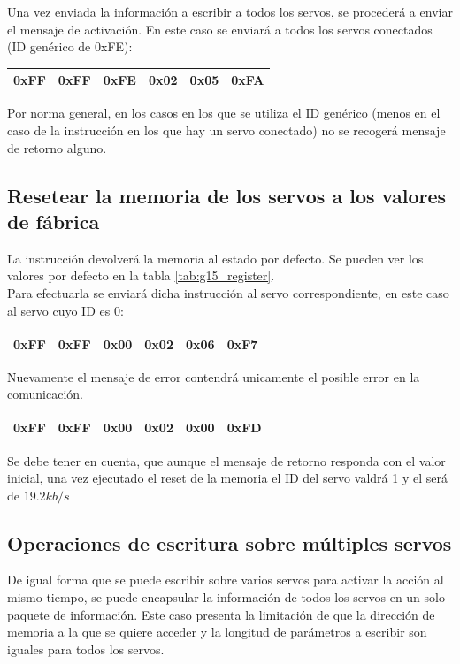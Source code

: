 		Una vez enviada la información a escribir a todos los servos, se procederá a enviar el mensaje de activación. En este caso se enviará a todos los servos conectados (ID genérico de 0xFE):
		\begin{center}
			\begin{tabular}{|c|c|c|c|c|c|}
				\hline
				0xFF & 0xFF & 0xFE & 0x02 & 0x05 & 0xFA \\
				\hline
			\end{tabular}
		\end{center}

		Por norma general, en los casos en los que se utiliza el ID genérico (menos en el caso de la instrucción  en los que hay un servo conectado) no se recogerá mensaje de retorno alguno.

	\subsection{Resetear la memoria de los servos a los valores de fábrica}

		La instrucción  devolverá la memoria al estado por defecto. Se pueden ver los valores por defecto en la tabla \ref{tab:g15_register}.
		\\

		Para efectuarla se enviará dicha instrucción al servo correspondiente, en este caso al servo cuyo ID es 0:
		\begin{center}
			\begin{tabular}{|c|c|c|c|c|c|}
				\hline
				0xFF & 0xFF & 0x00 & 0x02 & 0x06 & 0xF7 \\
				\hline
			\end{tabular}
		\end{center}

		 Nuevamente el mensaje de error contendrá unicamente el posible error en la comunicación.
		 \begin{center}
		 	\begin{tabular}{|c|c|c|c|c|c|}
		 		\hline
		 		0xFF & 0xFF & 0x00 & 0x02 & 0x00 & 0xFD \\
		 		\hline
		 	\end{tabular}
		 \end{center}

		 Se debe tener en cuenta, que aunque el mensaje de retorno responda con el valor inicial, una vez ejecutado el reset de la memoria el ID del servo valdrá 1 y el  será de $19.2kb/s$

	\subsection{Operaciones de escritura sobre múltiples servos}
		De igual forma que se puede escribir sobre varios servos para activar la acción al mismo tiempo, se puede encapsular la información de todos los servos en un solo paquete de información. Este caso presenta la limitación de que la dirección de memoria a la que se quiere acceder y la longitud de parámetros a escribir son iguales para todos los servos.
		\\

